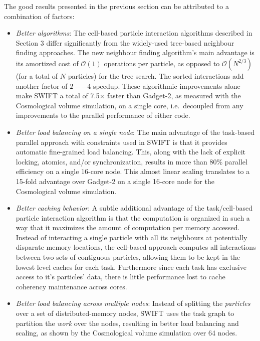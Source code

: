 \documentclass[final]{siamltex}
\newcommand{\oh}[1]
    {\mbox{$ {\mathcal O}( #1 ) $}}
\begin{document}
The good results presented in the previous section can be attributed to
a combination of factors:

\begin{itemize}

    \item {\em Better algorithms}: The cell-based particle interaction
        algorithms described in Section 3 differ significantly from the
        widely-used tree-based neighbour finding approaches.
        The new neighbour finding algorithm's main advantage is
        its amortized cost of \oh{1} operations per particle,
        as opposed to \oh{N^{2/3}} (for a total of $N$ particles)
        for the tree search.
        The sorted interactions add another factor of $2--4$ speedup.
        These algorithmic improvements alone make SWIFT a total
        of 7.5$\times$ faster than Gadget-2, as measured with the
        Cosmological volume simulation, on a single core, i.e.~decoupled
        from any improvements to the parallel performance of either code.
        
    \item {\em Better load balancing on a single node}: The main advantage
        of the task-based parallel approach with constraints
        used in SWIFT is that it
        provides automatic fine-grained load balancing.
        This, along with the
        lack of explicit locking, atomics, and/or synchronization,
        results in more than 80\% parallel efficiency
        on a single 16-core node.
        This almost linear scaling translates to a 15-fold advantage
        over Gadget-2 on a single 16-core node for the Cosmological
        volume simulation.
        
    \item {\em Better caching behavior}: A subtle additional advantage of
        the task/cell-based particle interaction algorithm is that
        the computation is organized in such a way that it maximizes the
        amount of computation per memory accessed.
        Instead of interacting a single particle with all its neighbours
        at potentially disparate memory locations, the cell-based
        approach computes all interactions between two sets of contiguous
        particles, allowing them to be kept in the lowest level caches
        for each task.
        Furthermore since each task has exclusive access to it's particles'
        data, there is little performance lost to cache coherency maintenance
        across cores.
    
    \item {\em Better load balancing across multiple nodes}: Instead of
        splitting the {\em particles} over a set of distributed-memory nodes,
        SWIFT uses the task graph to partition the {\em work} over
        the nodes, resulting
        in better load balancing and scaling, as shown by the Cosmological
        volume simulation over 64 nodes.
    

\end{itemize}
\end{document}
